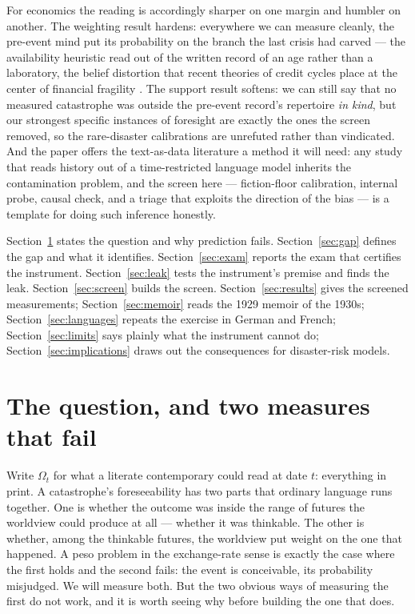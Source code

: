 \documentclass[11pt]{article}
\begin{document}
For economics the reading is accordingly sharper on one margin and humbler on another. The weighting
result hardens: everywhere we can measure cleanly, the pre-event mind put its probability on the branch
the last crisis had carved --- the availability heuristic \citep{tversky1973} read out of the written
record of an age rather than a laboratory, the belief distortion that recent theories of credit cycles
place at the center of financial fragility \citep{bordalo2018,gennaioli2018}. The support result softens:
we can still say that no measured catastrophe was outside the pre-event record's repertoire \emph{in
kind}, but our strongest specific instances of foresight are exactly the ones the screen removed, so the
rare-disaster calibrations are unrefuted rather than vindicated. And the paper offers the text-as-data
literature \citep{gentzkow2019} a method it will need: any study that reads history out of a
time-restricted language model inherits the contamination problem, and the screen here --- fiction-floor
calibration, internal probe, causal check, and a triage that exploits the direction of the bias --- is a
template for doing such inference honestly.

Section~\ref{sec:framework} states the question and why prediction fails. Section~\ref{sec:gap} defines
the gap and what it identifies. Section~\ref{sec:exam} reports the exam that certifies the instrument.
Section~\ref{sec:leak} tests the instrument's premise and finds the leak. Section~\ref{sec:screen} builds
the screen. Section~\ref{sec:results} gives the screened measurements; Section~\ref{sec:memoir} reads the
1929 memoir of the 1930s; Section~\ref{sec:languages} repeats the exercise in German and French;
Section~\ref{sec:limits} says plainly what the instrument cannot do; Section~\ref{sec:implications} draws
out the consequences for disaster-risk models.

\section{The question, and two measures that fail}\label{sec:framework}

Write $\Omega_t$ for what a literate contemporary could read at date $t$: everything in print. A
catastrophe's foreseeability has two parts that ordinary language runs together. One is whether the
outcome was inside the range of futures the worldview could produce at all --- whether it was thinkable.
The other is whether, among the thinkable futures, the worldview put weight on the one that happened. A
peso problem in the exchange-rate sense \citep{krasker1980} is exactly the case where the first holds and
the second fails: the event is conceivable, its probability misjudged. We will measure both. But the two
obvious ways of measuring the first do not work, and it is worth seeing why before building the one that
does.
\end{document}
